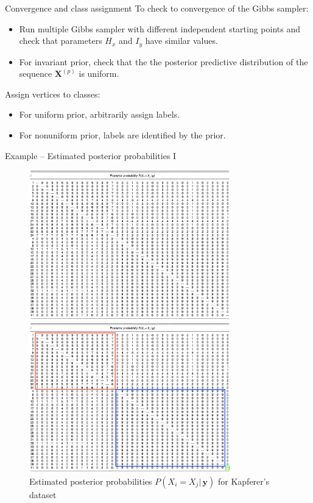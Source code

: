 \documentclass[aspectratio=169,xcolor=dvipsnames]{beamer}
\newcommand{\vecy}{\textbf{y}}
\newcommand{\matx}{\textbf{X}}
\begin{document}
\begin{frame}{Convergence and class assignment}
\vspace{-15pt}
To check to convergence of the Gibbs sampler:
\pause
\begin{itemize}
    \item Run multiple Gibbs sampler with different independent starting points and check that parameters $H_x $ and $I_y $ have similar values.
    \pause
    \item For invariant prior, check that the the posterior predictive distribution of the sequence $\matx^{(p)}$ is uniform.
\end{itemize}
\vspace{10pt}
\pause
Assign vertices to classes:
\pause
\begin{itemize}
    \item For uniform prior, arbitrarily assign labels.
    \pause
    \item For nonuniform prior, labels are identified by the prior.
\end{itemize}

\end{frame}
\begin{frame}{Example – Estimated posterior probabilities I}
\begin{figure}
    \begin{overprint}
    \centering
     \centering \includegraphics[keepaspectratio, height = 6.5cm]{utilities/exp_x.png}
    \caption{Estimated posterior probabilities $P(X_i=X_j| \, \vecy)$ for Kapferer's dataset}
    \label{fig:2}
    \setcounter{figure}{1}
     \centering \includegraphics[keepaspectratio, height = 6.5cm]{utilities/exp_x_labels.png}  \caption{Estimated posterior probabilities $P(X_i=X_j| \, \vecy)$ for Kapferer's dataset}
    \label{fig:2}
    \end{overprint}
\end{figure}
    
\end{frame}
\end{document}
